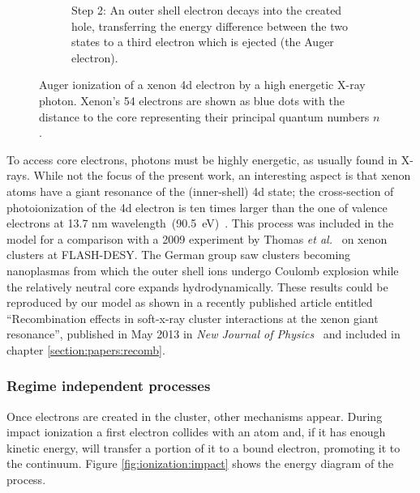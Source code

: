\begin{figure}
\begin{subfigure}[t]{0.45\columnwidth}
        \caption{Step 2: An outer shell electron decays into the created hole,
                 transferring the energy difference between the two states to a
                 third electron which is ejected (the Auger electron).}
        \label{fig:auger:2}
    \end{subfigure}
        \caption{\label{fig:auger}Auger ionization of a xenon 4d electron by a
                 high energetic X-ray photon. Xenon's 54 electrons are shown
                 as blue dots with the distance to the core representing their
                 principal quantum numbers $n$.}
\end{figure}

To access core electrons, photons must be highly energetic, as usually found in X-rays.
While not the focus of the present work, an interesting aspect is that xenon
atoms have a giant resonance of the (inner-shell) 4d state; the cross-section of
photoionization of the 4d electron is ten times larger than the
one of valence  electrons at 13.7 nm wavelength~(90.5~eV)~\cite{Becker1986}.
This process was included in the model for a comparison with a 2009 experiment
by Thomas \textit{et al.}~\cite{Thomas2009} on xenon clusters at FLASH-DESY.
The German group saw clusters becoming nanoplasmas from which the outer shell
ions undergo Coulomb explosion while the relatively neutral core expands
hydrodynamically. These results could be reproduced by our model as shown in a recently
published article entitled ``Recombination effects in soft-x-ray cluster
interactions at the xenon giant resonance'', published in May 2013 in
\textit{New Journal of Physics}~\cite{Ackad2013} and included in chapter
\ref{section:papers:recomb}.

\subsubsection{Regime independent processes}
\label{section:intro:mechanisms:noregime}

Once electrons are created in the cluster, other mechanisms appear. During
impact ionization a first electron collides with an atom and, if it has enough
kinetic energy, will transfer a portion of it to a bound electron, promoting it
to the continuum. Figure \ref{fig:ionization:impact} shows the energy diagram
of the process.

